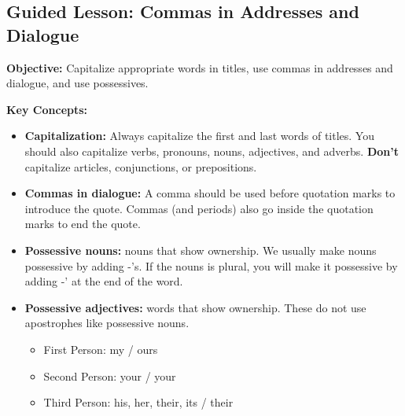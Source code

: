 \documentclass[12pt]{article}
\title{}
\date{}
\begin{document}
\subsection*{Guided Lesson: Commas in Addresses and Dialogue}
\onehalfspacing

\begin{tcolorbox}[colframe=black!40, colback=gray!5, 
coltitle=black, colbacktitle=black!20, fonttitle=\bfseries\Large, 
title=Learning Objective, halign title=center, left=5pt, right=5pt, top=5pt, bottom=15pt]
\textbf{Objective:} Capitalize appropriate words in titles, use commas in addresses and dialogue, and use possessives.
\end{tcolorbox}

\vspace{1em}

\begin{tcolorbox}[colframe=black!60, colback=white, 
coltitle=black, colbacktitle=black!15, fonttitle=\bfseries\Large, 
title=Key Concepts and Vocabulary, halign title=center, left=10pt, right=10pt, top=10pt, bottom=15pt]
\textbf{Key Concepts:}
\begin{itemize}
    \item \textbf{Capitalization:} Always capitalize the first and last words of titles. You should also capitalize verbs, pronouns, nouns, adjectives, and adverbs. \textbf{Don't} capitalize articles, conjunctions, or prepositions.
    \item \textbf{Commas in dialogue:} A comma should be used before quotation marks to introduce the quote. Commas (and periods) also go inside the quotation marks to end the quote.  
    \item \textbf{Possessive nouns:} nouns that show ownership. We usually make nouns possessive by adding -'s. If the nouns is plural, you will make it possessive by adding -' at the end of the word.
    \item \textbf{Possessive adjectives:} words that show ownership. These do not use apostrophes like possessive nouns.
    \begin{itemize}
        \item  First Person: my / ours
        \item Second Person: your / your
        \item Third Person: his, her, their, its / their
    \end{itemize}

   
    
    


\end{itemize}
\end{tcolorbox}
\end{document}
